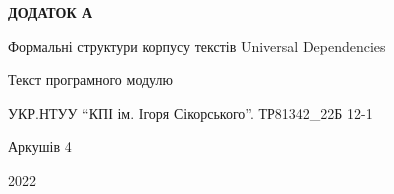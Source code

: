 \thispagestyle{empty}
{}

\begin{center}
\textbf{\Large ДОДАТОК А}

\vspace{10ex}
Формальні структури корпусу текстів Universal Dependencies

\vspace{10ex}
Текст програмного модулю

\vspace{10ex}
УКР.НТУУ ``КПІ ім. Ігоря Сікорського''. ТР81342\_22Б 12-1

\vspace{10ex}
Аркушів 4

\vfill
2022
\end{center}

\newpage

